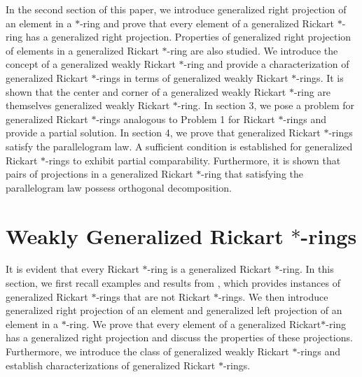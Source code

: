 \documentclass[11pt, one side,emlines]{amsart}
\theoremstyle{definition}
\numberwithin{equation}{section} \thispagestyle{empty} \voffset
\begin{document}
    In the second section of this paper, we introduce generalized right projection of an element in a $*$-ring and prove that every element of a generalized Rickart $*$-ring has a generalized right projection. Properties of generalized right projection of  elements in a generalized Rickart $*$-ring are also studied. We introduce the concept of a generalized weakly Rickart $*$-ring and provide a characterization of generalized Rickart $*$-rings in terms of generalized weakly Rickart $*$-rings. It is shown that the center and corner of a generalized weakly Rickart $*$-ring are themselves generalized weakly Rickart $*$-ring. In section 3, we pose a problem for generalized Rickart $*$-rings analogous to Problem 1 for Rickart $*$-rings and provide a partial solution. In section 4, we prove that generalized Rickart $*$-rings satisfy the parallelogram law. A sufficient condition is established for generalized Rickart $*$-rings to exhibit partial comparability. Furthermore, it is shown that pairs of projections in a generalized Rickart $*$-ring that satisfying the parallelogram law possess orthogonal decomposition. 
  
 \section{Weakly Generalized  Rickart $*$-rings}  
 
   It is evident that every Rickart $*$-ring is a generalized Rickart $*$-ring. 
  In this section, we first recall examples and results from \cite{ahmadigen2021}, which provides instances of generalized Rickart $*$-rings that are not Rickart $*$-rings. We then introduce generalized right projection of an element and generalized left projection of an element in a $*$-ring. We prove that every element of a generalized Rickart$*$-ring has a generalized right projection and discuss the properties of these projections. Furthermore, we introduce the class of generalized weakly Rickart $*$-rings and establish characterizations of generalized Rickart $*$-rings. 
  
\end{document}
